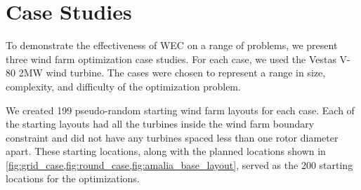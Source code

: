 \documentclass[a4paper]{jpconf}
\begin{document}
%
%

\section{Case Studies}
To demonstrate the effectiveness of WEC on a range of problems, we present three wind farm optimization case studies. For each case, we used the Vestas V-80 2MW wind turbine. The cases were chosen to represent a range in size, complexity, and difficulty of the optimization problem.

We created 199 pseudo-random starting wind farm layouts for each case. Each of the starting layouts had all the turbines inside the wind farm boundary constraint and did not have any turbines spaced less than one rotor diameter apart. These starting locations, along with the planned locations shown in \cref{fig:grid_case,fig:round_case,fig:amalia_base_layout}, served as the 200 starting locations for the optimizations.
\end{document}
